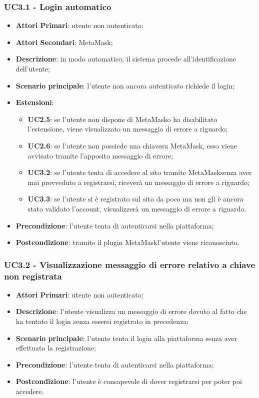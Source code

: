\subsubsection{UC3.1 - Login automatico}
\begin{itemize}
	\item \textbf{Attori Primari}:
	utente non autenticato;
	\item \textbf{Attori Secondari}:
	MetaMask\glo;
	\item \textbf{Descrizione}:
	in modo automatico, il sistema procede all'identificazione dell'utente;
	\item \textbf{Scenario principale}:
	l'utente non ancora autenticato richiede il login;
	\item \textbf{Estensioni}:
	\begin{itemize}
		\item \textbf{UC2.5}: se l'utente non dispone di MetaMask\glosp o ha disabilitato l'estensione, viene visualizzato un messaggio di errore a riguardo;
		\item \textbf{UC2.6}: se l'utente non possiede una chiave\glosp su MetaMask\glo, esso viene avvisato tramite l'apposito messaggio di errore;
		\item \textbf{UC3.2}: se l'utente tenta di accedere al sito tramite MetaMask\glosp senza aver mai provveduto a registrarsi, riceverà un messaggio di errore a riguardo;
		
		\item \textbf{UC3.3}: se l'utente si è registrato sul sito da poco ma non gli è ancora stato validato l'account, visualizzerà un messaggio di errore a riguardo.
	\end{itemize}
	\item \textbf{Precondizione}:
	l'utente tenta di autenticarsi nella piattaforma;
	\item \textbf{Postcondizione}:
	tramite il plugin MetaMask\glosp l'utente viene riconosciuto.
\end{itemize}
\subsubsection{UC3.2 - Visualizzazione messaggio di errore relativo a chiave non registrata}
\begin{itemize}
	\item \textbf{Attori Primari}:
	utente non autenticato;
	\item \textbf{Descrizione}:
	l'utente visualizza un messaggio di errore dovuto al fatto che ha tentato il login senza essersi registrato in precedenza;
	\item \textbf{Scenario principale}:
	l'utente tenta il login alla piattaforma senza aver effettuato la registrazione;
	\item \textbf{Precondizione}:
	l'utente tenta di autenticarsi nella piattaforma;
	\item \textbf{Postcondizione}:
	l'utente è consapevole di dover registrarsi per poter poi accedere.
\end{itemize}
